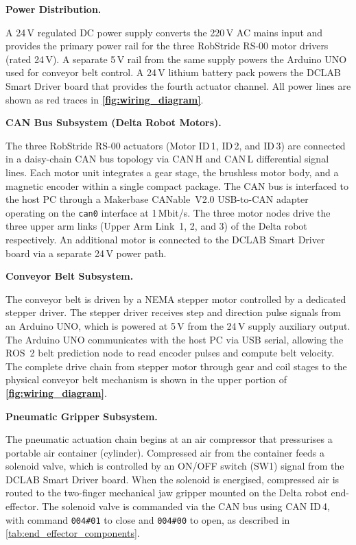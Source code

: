 \par
\noindent\textbf{Power Distribution.}\par
\hspace{1.27cm}
A 24\,V regulated DC power supply converts the 220\,V AC
mains input and provides the primary power rail for the
three RobStride RS-00 motor drivers (rated 24\,V). A separate
5\,V rail from the same supply powers the Arduino UNO used for
conveyor belt control. A 24\,V lithium battery pack powers
the DCLAB Smart Driver board that provides the fourth
actuator channel. All power lines are shown as red traces
in \textbf{\autoref{fig:wiring_diagram}}.

\par
\noindent\textbf{CAN Bus Subsystem (Delta Robot Motors).}\par
\hspace{1.27cm}
The three RobStride RS-00 actuators (Motor ID\,1, ID\,2,
and ID\,3) are connected in a daisy-chain CAN bus topology
via CAN\,H and CAN\,L differential signal lines. Each motor
unit integrates a gear stage, the brushless motor body, and
a magnetic encoder within a single compact package. The CAN
bus is interfaced to the host PC through a Makerbase
CANable~V2.0 USB-to-CAN adapter operating on the
\texttt{can0} interface at 1\,Mbit/s. The three motor nodes
drive the three upper arm links (Upper Arm Link~1, 2, and 3)
of the Delta robot respectively. An additional motor is
connected to the DCLAB Smart Driver board via a separate
24\,V power path.

\par
\noindent\textbf{Conveyor Belt Subsystem.}\par
\hspace{1.27cm}
The conveyor belt is driven by a NEMA stepper motor
controlled by a dedicated stepper driver. The stepper driver
receives step and direction pulse signals from an Arduino
UNO, which is powered at 5\,V from the 24\,V supply
auxiliary output. The Arduino UNO communicates with the host
PC via USB serial, allowing the ROS~2 belt prediction node
to read encoder pulses and compute belt velocity. The
complete drive chain from stepper motor through gear and
coil stages to the physical conveyor belt mechanism is
shown in the upper portion of
\textbf{\autoref{fig:wiring_diagram}}.

\par
\noindent\textbf{Pneumatic Gripper Subsystem.}\par
\hspace{1.27cm}
The pneumatic actuation chain begins at an air compressor
that pressurises a portable air container (cylinder).
Compressed air from the container feeds a solenoid valve,
which is controlled by an ON/OFF switch (SW1) signal from
the DCLAB Smart Driver board. When the solenoid is
energised, compressed air is routed to the two-finger
mechanical jaw gripper mounted on the Delta robot
end-effector. The solenoid valve is commanded via the
CAN bus using CAN ID\,4, with command
\texttt{004\#01} to close and \texttt{004\#00} to open,
as described in \autoref{tab:end_effector_components}.

